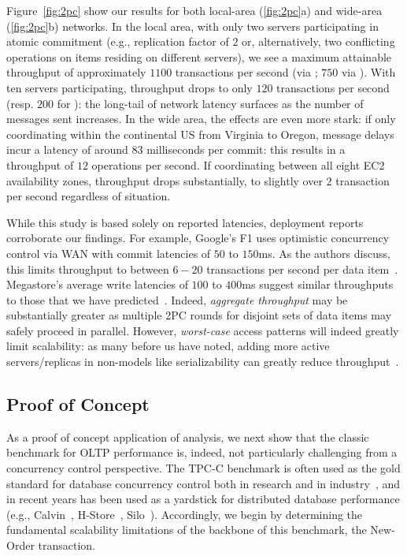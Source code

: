 Figure~\ref{fig:2pc} show our results for both local-area
(\ref{fig:2pc}a) and wide-area (\ref{fig:2pc}b) networks.  In the
local area, with only two servers participating in atomic commitment
(e.g., replication factor of $2$ or, alternatively, two conflicting
operations on items residing on different servers), we see a maximum
attainable throughput of approximately $1100$ transactions per second
(via \dpc; $750$ via \cpc). With ten servers participating, \dpc
throughput drops to only $120$ transactions per second (resp. $200$
for \cpc): the long-tail of network latency surfaces as the number of
messages sent increases. In the wide area, the effects are even more
stark: if only coordinating within the continental US from Virginia to
Oregon, \dpc message delays incur a latency of around $83$
milliseconds per commit: this results in a throughput of $12$
operations per second. If coordinating between all eight EC2
availability zones, throughput drops substantially, to slightly over
$2$ transaction per second regardless of situation.

While this study is based solely on reported latencies, deployment
reports corroborate our findings. For example, Google's F1 uses
optimistic concurrency control via WAN with commit latencies of
$50$ to $150$ms. As the authors discuss, this limits throughput to between
$6-20$ transactions per second per data item~\cite{f1}. Megastore's
average write latencies of $100$ to $400$ms suggest similar throughputs to
those that we have predicted~\cite{megastore}. Indeed,
\textit{aggregate throughput} may be substantially greater as multiple
2PC rounds for disjoint sets of data items may safely proceed in
parallel. However, \textit{worst-case} access patterns will indeed
greatly limit scalability: as many before us have noted, adding more
active servers/replicas in non-\cfree models like serializability can
greatly reduce throughput~\cite{abadi-vll,calvin,jones-dtxn}.

\subsection{Proof of Concept}

As a proof of concept application of \cfreedom analysis, we next show
that the classic benchmark for OLTP performance is, indeed, not
particularly challenging from a concurrency control perspective. The
TPC-C benchmark is often used as the gold standard for database
concurrency control both in research and in industry~\cite{tpcc}, and
in recent years has been used as a yardstick for distributed database
performance (e.g., Calvin~\cite{calvin}, H-Store~\cite{hstore},
Silo~\cite{silo}). Accordingly, we begin by determining the
fundamental scalability limitations of the backbone of this benchmark,
the New-Order transaction.


